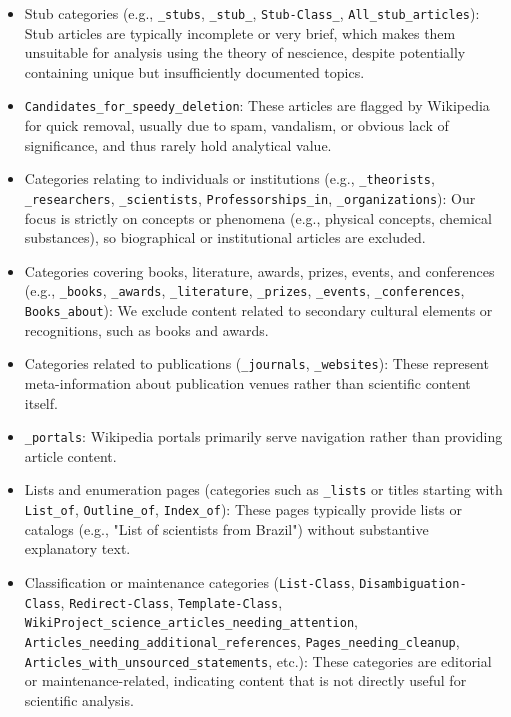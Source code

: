 \begin{itemize}

\item Stub categories (e.g., \texttt{\_stubs}, \texttt{\_stub\_}, \texttt{Stub-Class\_}, \texttt{All\_stub\_articles}): Stub articles are typically incomplete or very brief, which makes them unsuitable for analysis using the theory of nescience, despite potentially containing unique but insufficiently documented topics.

\item \texttt{Candidates\_for\_speedy\_deletion}: These articles are flagged by Wikipedia for quick removal, usually due to spam, vandalism, or obvious lack of significance, and thus rarely hold analytical value.

\item Categories relating to individuals or institutions (e.g., \texttt{\_theorists}, \texttt{\_researchers}, \texttt{\_scientists}, \texttt{Professorships\_in}, \texttt{\_organizations}): Our focus is strictly on concepts or phenomena (e.g., physical concepts, chemical substances), so biographical or institutional articles are excluded.

\item Categories covering books, literature, awards, prizes, events, and conferences (e.g., \texttt{\_books}, \texttt{\_awards}, \texttt{\_literature}, \texttt{\_prizes}, \texttt{\_events}, \texttt{\_conferences}, \texttt{Books\_about}): We exclude content related to secondary cultural elements or recognitions, such as books and awards.

\item Categories related to publications (\texttt{\_journals}, \texttt{\_websites}): These represent meta-information about publication venues rather than scientific content itself.

\item \texttt{\_portals}: Wikipedia portals primarily serve navigation rather than providing article content.

\item Lists and enumeration pages (categories such as \texttt{\_lists} or titles starting with \texttt{List\_of}, \texttt{Outline\_of}, \texttt{Index\_of}): These pages typically provide lists or catalogs (e.g., "List of scientists from Brazil") without substantive explanatory text.

\item Classification or maintenance categories (\texttt{List-Class}, \texttt{Disambiguation-Class}, \texttt{Redirect-Class}, \texttt{Template-Class}, \texttt{WikiProject\_science\_articles\_needing\_attention}, \texttt{Articles\_needing\_additional\_references}, \texttt{Pages\_needing\_cleanup}, \texttt{Articles\_with\_unsourced\_statements}, etc.): These categories are editorial or maintenance-related, indicating content that is not directly useful for scientific analysis.


\end{itemize}
